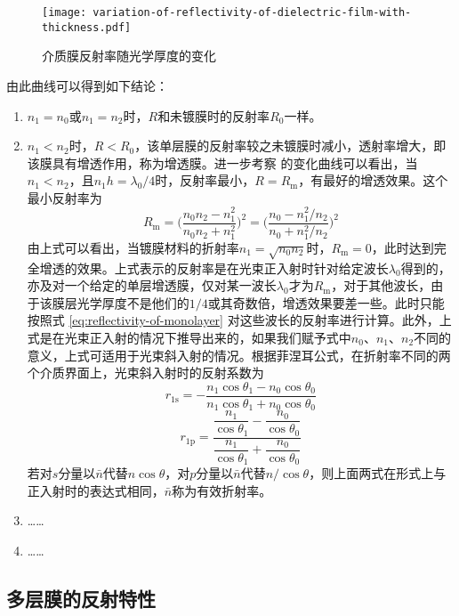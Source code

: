 \documentclass[cn,10pt,chinesefont=founder,math=mtpro2,cite=super,toc=onecol,twoside]{elegantbook}
\begin{document}
\begin{figure}[htbp]
	\centering
	\texttt{[image: variation-of-reflectivity-of-dielectric-film-with-thickness.pdf]}
	\caption{介质膜反射率随光学厚度的变化}
	\label{fig:variation-of-reflectivity-of-dielectric-film-with-thickness}
\end{figure}

由此曲线可以得到如下结论：
\begin{enumerate}
	\item $n_1=n_0$或$n_1=n_2$时，$R$和未镀膜时的反射率$R_0$一样。
	\item $n_1<n_2$时，$R<R_0$，该单层膜的反射率较之未镀膜时减小，透射率增大，即该膜具有增透作用，称为增透膜。进一步考察 的变化曲线可以看出，当$n_1<n_2$，且$n_1h=\lambda_0/4$时，反射率最小，$R=R_\mathrm{m}$，有最好的增透效果。这个最小反射率为
	\begin{equation}
	R_\mathrm{m}=\bigg(\frac{n_0n_2-n^2_1}{n_0n_2+n^2_1}\bigg)^2=\bigg(\frac{n_0-n^2_1/n_2}{n_0+n^2_1/n_2}\bigg)^2
	\end{equation}
	由上式可以看出，当镀膜材料的折射率$n_1=\sqrt{n_0n_2}$时，$R_\mathrm{m}=0$，此时达到完全增透的效果。上式表示的反射率是在光束正入射时针对给定波长$\lambda_0$得到的，亦及对一个给定的单层增透膜，仅对某一波长$\lambda_0$才为$R_\mathrm{m}$，对于其他波长，由于该膜层光学厚度不是他们的$1/4$或其奇数倍，增透效果要差一些。此时只能按照式 \eqref{eq:reflectivity-of-monolayer} 对这些波长的反射率进行计算。此外，上式是在光束正入射的情况下推导出来的，如果我们赋予式中$n_0$、$n_1$、$n_2$不同的意义，上式可适用于光束斜入射的情况。根据菲涅耳公式，在折射率不同的两个介质界面上，光束斜入射时的反射系数为
	\begin{equation}
	r_{1\mathrm{s}}=-\frac{n_1\cos\theta_1-n_0\cos\theta_0}{n_1\cos\theta_1+n_0\cos\theta_0}
	\end{equation}
	\begin{equation}
	r_{1\mathrm{p}}=\frac{\dfrac{n_1}{\cos\theta_1}-\dfrac{n_0}{\cos\theta_0}}{\dfrac{n_1}{\cos\theta_1}+\dfrac{n_0}{\cos\theta_0}}
	\end{equation}
	若对$s$分量以$\bar{n}$代替$n\cos\theta$，对$p$分量以$\bar{n}$代替$n/\cos\theta$，则上面两式在形式上与正入射时的表达式相同，$\bar{n}$称为有效折射率。
	\item ……
	\item ……
\end{enumerate}

\subsection{多层膜的反射特性}
\end{document}
